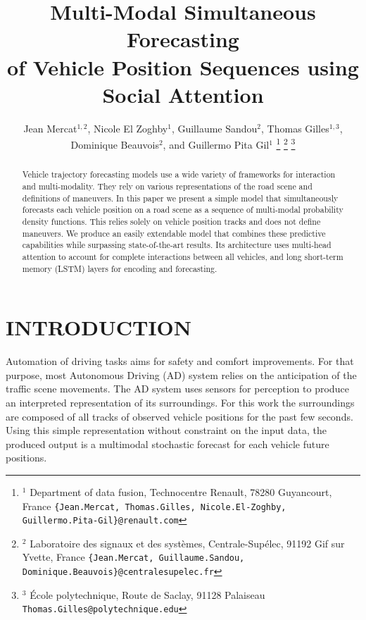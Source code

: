 \documentclass[a4paper, 10pt, conference]{ieeeconf}      %
\title{\LARGE \bf
Multi-Modal Simultaneous Forecasting\\%
of Vehicle Position Sequences using Social Attention
}
\author{Jean Mercat$^{1, 2}$, Nicole El Zoghby$^{1}$, Guillaume Sandou$^{2}$, Thomas Gilles$^{1, 3}$,\\%
Dominique Beauvois$^{2}$, and Guillermo Pita Gil$^{1}$%
\thanks{$^{1}$ Department of data fusion,
        Technocentre Renault, 78280 Guyancourt, France
        {\tt\Small \{Jean.Mercat, Thomas.Gilles, Nicole.El-Zoghby, Guillermo.Pita-Gil\}@renault.com}}%
\thanks{$^{2}$ Laboratoire des signaux et des syst\`emes,
        Centrale-Sup\'elec, 91192 Gif sur Yvette, France
        {\tt\Small \{Jean.Mercat, Guillaume.Sandou, Dominique.Beauvois\}@centralesupelec.fr}}%
\thanks{$^{3}$ \'Ecole polytechnique,
        Route de Saclay, 91128 Palaiseau
        {\tt\Small Thomas.Gilles@polytechnique.edu}}%
}
\begin{document}





\maketitle
\thispagestyle{empty}
\pagestyle{empty}


\begin{abstract}

Vehicle trajectory forecasting models use a wide variety of frameworks for interaction and multi-modality.
They rely on various representations of the road scene and definitions of maneuvers.
In this paper we present a simple model that
simultaneously forecasts each vehicle position on a road scene as a sequence
of multi-modal probability density functions.
This relies solely on vehicle position tracks and does not define maneuvers.
We produce an easily extendable model that combines these predictive capabilities while surpassing state-of-the-art
results.
Its architecture uses multi-head attention to account for complete interactions between all vehicles,
and long short-term memory (LSTM) layers for encoding and forecasting.

\end{abstract}


\section{INTRODUCTION}

Automation of driving tasks aims for safety and comfort improvements.
For that purpose, most Autonomous Driving (AD) system relies on the anticipation of the
traffic scene movements.
The AD system uses sensors for perception to produce an interpreted representation of its surroundings.
For this work the surroundings are composed of all tracks of observed vehicle positions for the past
few seconds.
Using this simple representation without constraint on the input data, the produced output is a multimodal stochastic
forecast for each vehicle future positions.
\end{document}
